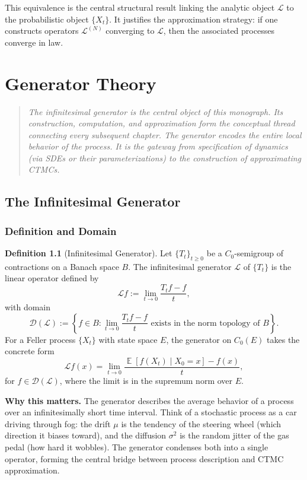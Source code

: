 \documentclass[11pt,a4paper,openany]{book}
\theoremstyle{definition}
\newtheorem{definition}{Definition}[chapter]
\theoremstyle{plain}
\theoremstyle{remark}
\DeclareMathOperator{\E}{\mathbb{E}}
\newcommand{\1}{\mathbbm{1}}
\newcommand{\calL}{\mathcal{L}}
\newcommand{\calD}{\mathcal{D}}
\begin{document}
This equivalence is the central structural result linking the analytic object $\calL$ to the probabilistic object $\{X_{t}\}$. It justifies the approximation strategy: if one constructs operators $\calL^{(N)}$ converging to $\calL$, then the associated processes converge in law.

\part{Generator Theory}

\begin{quote}
\itshape The infinitesimal generator is the central object of this monograph. Its construction, computation, and approximation form the conceptual thread connecting every subsequent chapter. The generator encodes the entire local behavior of the process. It is the gateway from specification of dynamics (via SDEs or their parameterizations) to the construction of approximating CTMCs.
\end{quote}

\chapter{The Infinitesimal Generator}

\section{Definition and Domain}

\begin{definition}[Infinitesimal Generator]
Let $\{T_{t}\}_{t \geq 0}$ be a $C_{0}$-semigroup of contractions on a Banach space $B$. The infinitesimal generator $\calL$ of $\{T_{t}\}$ is the linear operator defined by
\[
\calL f := \lim_{t \to 0} \frac{T_{t} f - f}{t},
\]
with domain
\[
\calD(\calL) := \left\{f \in B : \lim_{t \to 0} \frac{T_{t} f - f}{t} \text{ exists in the norm topology of } B\right\}.
\]
For a Feller process $\{X_{t}\}$ with state space $E$, the generator on $C_{0}(E)$ takes the concrete form
\[
\calL f(x) = \lim_{t \to 0} \frac{\E[f(X_{t}) \mid X_{0} = x] - f(x)}{t},
\]
for $f \in \calD(\calL)$, where the limit is in the supremum norm over $E$.
\end{definition}

\medskip
\noindent\textbf{Why this matters.} The generator describes the average behavior of a process over an infinitesimally short time interval. Think of a stochastic process as a car driving through fog: the drift $\mu$ is the tendency of the steering wheel (which direction it biases toward), and the diffusion $\sigma^2$ is the random jitter of the gas pedal (how hard it wobbles). The generator condenses both into a single operator, forming the central bridge between process description and CTMC approximation.
\end{document}
